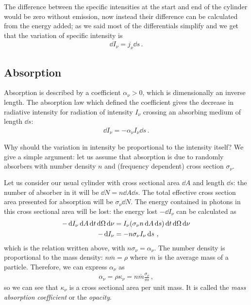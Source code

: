 \documentclass[main.tex]{subfiles}
\begin{document}
The difference between the specific intensities at the start and end of the cylinder would be zero without emission, now instead their difference can be calculated from the energy added; as we said most of the differentials simplify and we get that the variation of specific intensity is
%
\begin{align}
\dd{I_{\nu }} = j_{\nu } \dd{s}
\,.
\end{align}

\subsection{Absorption}

Absorption is described by a coefficient \(\alpha_{\nu }>0\), which is dimensionally an inverse length. 
The absorption law which defined the coefficient gives the decrease in radiative intensity for radiation of intensity \(I_{\nu }\) crossing an absorbing medium of length \(\dd{s}\):
%
\begin{align}
\dd{I_{\nu }} =- \alpha_{\nu } I_{\nu } \dd{s}
\,.
\end{align}

Why should the variation in intensity be proportional to the intensity itself? We give a simple argument: 
let us assume that absorption is due to randomly absorbers with number density \(n\) and (frequency dependent) cross section \(\sigma_{\nu }\).  

Let us consider our usual cylinder with cross sectional area \(\dd{A}\) and length \(\dd{s}\): the number of absorber in it will be \(\dd{N} = n \dd{A} \dd{s}\). 
The total effective cross section area presented for absorption will be \(\sigma_{\nu } \dd{N}\). 
The energy contained in photons in this cross sectional area will be lost: the energy lost \(- \dd{I_{\nu }}\) can be calculated as 
%
\begin{subequations}
\begin{align}
- \dd{I_{\nu }} \dd{A} \dd{t} \dd{\Omega} \dd{\nu }
&=  I_{\nu } \qty(\sigma_{\nu } n \dd{A} \dd{s}) \dd{t} \dd{\Omega } \dd{\nu }  \\
- \dd{I_{\nu }} &= - n \sigma_{\nu } I_{\nu } \dd{s}
\,,
\end{align}
\end{subequations}
%
which is the relation written above, with \(n \sigma_{\nu } = \alpha_{\nu }\). 
The number density is proportional to the mass density: \(n \overline{m} = \rho \) where \(\overline{m} \) is the average mass of a particle. Therefore, we can express \(\alpha_{\nu }\) as 
%
\begin{align}
\alpha_{\nu } = \rho \kappa_{\nu } = n \overline{m} \frac{ \sigma_{\nu }}{\overline{m}}
\,,
\end{align}
%
so we can see that \(\kappa_{\nu }\) is a cross sectional area per unit mass. It is called the \emph{mass absorption coefficient} or the \emph{opacity}. 
\end{document}
